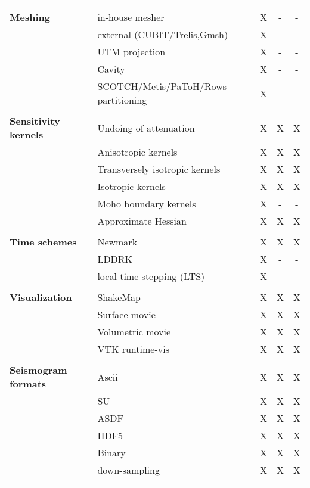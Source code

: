 \begin{table}[htp]
\begin{center}
\begin{tabular}{ l l c c c}
\hline
& & & & \\
{\bf Meshing}           & in-house mesher                       & X  & -  & - \\
                        & external (CUBIT/Trelis,Gmsh)          & X  & -  & - \\
                        & UTM projection                        & X  & -  & - \\
                        & Cavity                                & X  & -  & - \\
                        & SCOTCH/Metis/PaToH/Rows partitioning  & X  & -  & - \\
\hline
& & & & \\
{\bf Sensitivity kernels} & Undoing of attenuation          & X  & X  & X \\
                          & Anisotropic kernels             & X  & X  & X \\
                          & Transversely isotropic kernels  & X  & X  & X \\
                          & Isotropic kernels               & X  & X  & X \\
                          & Moho boundary kernels           & X  & -  & - \\
                          & Approximate Hessian             & X  & X  & X \\
\hline
& & & & \\
{\bf Time schemes}  & Newmark   & X  & X  & X  \\
                    & LDDRK     & X  & -  & -  \\
                    & local-time stepping (LTS) & X  & -  & -  \\
\hline
& & & & \\
{\bf Visualization} & ShakeMap          & X  & X  & X \\
                    & Surface movie     & X  & X  & X \\
                    & Volumetric movie  & X  & X  & X \\
                    & VTK runtime-vis   & X  & X  & X \\
\hline
& & & & \\
{\bf Seismogram formats}  & Ascii          & X  & X  & X \\
                          & SU             & X  & X  & X \\
                          & ASDF           & X  & X  & X \\
                          & HDF5           & X  & X  & X \\
                          & Binary         & X  & X  & X \\
                          & down-sampling  & X  & X  & X \\
%
\hline
& & & & \\ %
\end{tabular}
\end{center}
\end{table}


